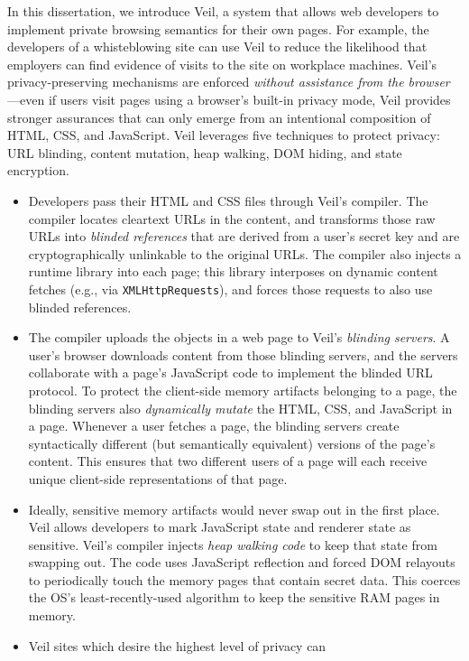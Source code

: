 In this dissertation, we introduce Veil, a system
that allows web developers to implement
private browsing semantics for their own pages.
For example, the developers of a whisteblowing
site can use Veil to reduce the likelihood
that employers can find evidence of visits to
the site on workplace machines.
Veil's privacy-preserving mechanisms are
enforced \emph{without assistance from the
	browser}---even if users visit pages using
a browser's built-in privacy mode, Veil
provides stronger assurances that
can only emerge from an intentional
composition of HTML, CSS, and JavaScript.
Veil leverages five techniques to protect
privacy: URL blinding, content mutation,
heap walking, DOM hiding, and state encryption.
\begin{itemize}
	\item Developers pass their HTML and CSS files through
	Veil's compiler. The compiler locates cleartext
	URLs in the content, and transforms those raw
	URLs into \emph{blinded references} that are
	derived from a user's secret key and are
	cryptographically unlinkable to the original
	URLs. The compiler also injects a runtime
	library into each page; this library interposes
	on dynamic content fetches (e.g., via
	\texttt{XMLHttpRequests}), and forces those
	requests to also use blinded references.
	\item The compiler uploads the objects in a web page to
	Veil's \emph{blinding servers}. A user's browser
	downloads content from those blinding servers, and
	the servers collaborate with a page's JavaScript
	code to implement the blinded URL protocol. To
	protect the client-side memory artifacts belonging
	to a page, the blinding servers also \emph{dynamically
		mutate} the HTML, CSS, and JavaScript in a page.
	Whenever a user fetches a page, the blinding servers
	create syntactically different (but semantically
	equivalent) versions of the page's content. This
	ensures that two different users of a page will
	each receive unique client-side representations
	of that page.
	\item Ideally, sensitive memory artifacts would never
	swap out in the first place. Veil allows developers
	to mark JavaScript state and renderer state as
	sensitive. Veil's compiler injects \emph{heap
		walking code} to keep that state from swapping out.
	The code uses JavaScript reflection
	and forced DOM relayouts to periodically touch the
	memory pages that contain secret data. This coerces
	the OS's least-recently-used algorithm to keep the
	sensitive RAM pages in memory.
	\item Veil sites which desire the highest level of privacy can

\end{itemize}
